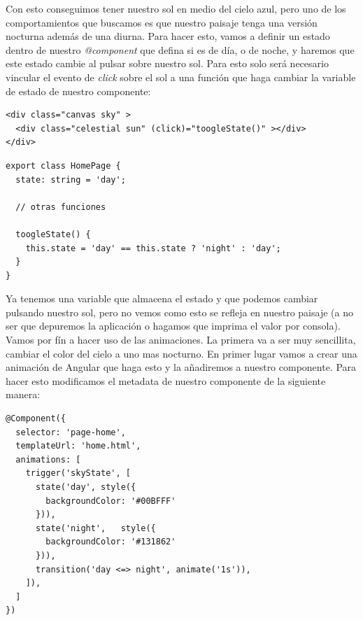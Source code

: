 Con esto conseguimos tener nuestro sol en medio del cielo azul, pero uno de los comportamientos que buscamos es que nuestro paisaje tenga una versión nocturna  además de una diurna. Para hacer esto, vamos a definir un estado dentro de nuestro \emph{@component} que defina si es de día, o de noche, y haremos que este estado cambie al pulsar sobre nuestro sol. Para esto solo será necesario vincular el evento de \emph{click} sobre el sol a una función que haga cambiar la variable de estado de nuestro componente:

\noindent
\begin{minipage}[t]{.48\textwidth}
{\begin{lstlisting}[style=htmlcssjs,frame=tlrb, xleftmargin={0.2cm}]
<div class="canvas sky" >
  <div class="celestial sun" (click)="toogleState()" ></div>
</div>
\end{lstlisting}}
\end{minipage}\hfill
\noindent
\begin{minipage}[t]{.48\textwidth}
{\begin{lstlisting}[style=htmlcssjs,frame=tlrb, xleftmargin={0.2cm}]
export class HomePage {
  state: string = 'day';

  // otras funciones

  toogleState() {
    this.state = 'day' == this.state ? 'night' : 'day';
  }
}
\end{lstlisting}}
\end{minipage}

Ya tenemos una variable que almacena el estado y que podemos cambiar pulsando nuestro sol, pero no vemos como esto se refleja en nuestro paisaje (a no ser que depuremos la aplicación o hagamos que imprima el valor por consola). Vamos por fín a hacer uso de las animaciones. La primera va a ser muy sencillita, cambiar el color del cielo a uno mas nocturno. En primer lugar vamos a crear una animación de Angular que haga esto y la añadiremos a nuestro componente. Para hacer esto modificamos el metadata de nuestro componente de la siguiente manera:

{\begin{lstlisting}[style=htmlcssjs,frame=tlrb, xleftmargin={0.2cm}]
@Component({
  selector: 'page-home',
  templateUrl: 'home.html',
  animations: [
    trigger('skyState', [
      state('day', style({
        backgroundColor: '#00BFFF'
      })),
      state('night',   style({
        backgroundColor: '#131862'
      })),
      transition('day <=> night', animate('1s')),
    ]),
  ]
})
\end{lstlisting}}

